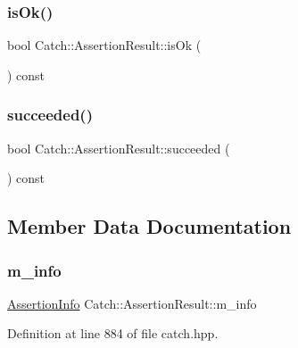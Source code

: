\subsubsection{\texorpdfstring{is\+Ok()}{isOk()}}
{\footnotesize\ttfamily bool Catch\+::\+Assertion\+Result\+::is\+Ok (\begin{DoxyParamCaption}{ }\end{DoxyParamCaption}) const}

\hypertarget{class_catch_1_1_assertion_result_ac5cc872b721d5fb65d87221d30b22fdd}{}\label{class_catch_1_1_assertion_result_ac5cc872b721d5fb65d87221d30b22fdd} 
\subsubsection{\texorpdfstring{succeeded()}{succeeded()}}
{\footnotesize\ttfamily bool Catch\+::\+Assertion\+Result\+::succeeded (\begin{DoxyParamCaption}{ }\end{DoxyParamCaption}) const}



\subsection{Member Data Documentation}
\hypertarget{class_catch_1_1_assertion_result_a3e7236f73a51d6fc8bb9dfdefcee7772}{}\label{class_catch_1_1_assertion_result_a3e7236f73a51d6fc8bb9dfdefcee7772} 
\subsubsection{\texorpdfstring{m\+\_\+info}{m\_info}}
{\footnotesize\ttfamily \hyperlink{struct_catch_1_1_assertion_info}{Assertion\+Info} Catch\+::\+Assertion\+Result\+::m\+\_\+info\hspace{0.3cm}{\ttfamily [protected]}}



Definition at line 884 of file catch.\+hpp.

\hypertarget{class_catch_1_1_assertion_result_add3455b8bbedb0d643e18da67c66b4f7}{}\label{class_catch_1_1_assertion_result_add3455b8bbedb0d643e18da67c66b4f7} 
